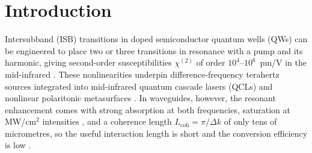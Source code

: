 \documentclass[11pt]{article}
\newcommand{\chitwo}{\chi^{(2)}}
\begin{document}
\section{Introduction}
Intersubband (ISB) transitions in doped semiconductor quantum wells (QWs) can be engineered to place two or three transitions in resonance with a pump and its harmonic, giving second-order susceptibilities $\chitwo$ of order $10^4$--$10^6$~pm/V in the mid-infrared \cite{Fejer1989,Rosencher1991,Rosencher1996,Meyer1995,Vurgaftman1996,Vurgaftman2021}. These nonlinearities underpin difference-frequency terahertz sources integrated into mid-infrared quantum cascade lasers (QCLs) \cite{Belkin2007,Fujita2018} and nonlinear polaritonic metasurfaces \cite{Lee2014,Sarma2020,Yu2022,Yu2024,Krakofsky2023}. In waveguides, however, the resonant enhancement comes with strong absorption at both frequencies, saturation at MW/cm$^2$ intensities \cite{Boucaud1991}, and a coherence length $L_\mathrm{coh}=\pi/\Delta k$ of only tens of micrometres, so the useful interaction length is short and the conversion efficiency is low \cite{Vurgaftman2021,Vurgaftman1996,Chesi2023}.
\end{document}
